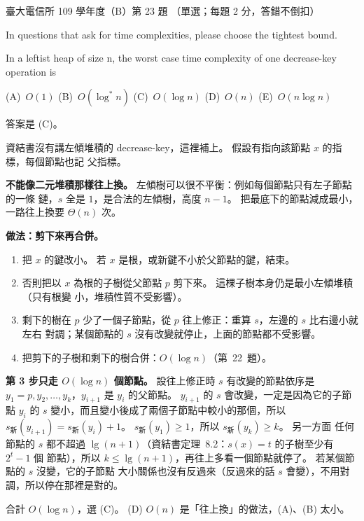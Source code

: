 \begin{pastexam}[label={px:ntu-109-comm-dsa-23}]{臺大電信所 109 學年度（B）第 23 題}
（單選；每題 2 分，答錯不倒扣）

In questions that ask for time complexities, please choose the tightest bound.

In a leftist heap of size n, the worst case time complexity of one decrease-key operation is

(A)~$O(1)$ \qquad (B)~$O(\log^* n)$ \qquad (C)~$O(\log n)$ \qquad (D)~$O(n)$ \qquad (E)~$O(n\log n)$
\end{pastexam}

\begin{pastsoln}
答案是 (C)。

資結書沒有講左傾堆積的 decrease-key，這裡補上。 假設有指向該節點 $x$ 的指標，每個節點也記
父指標。

\textbf{不能像二元堆積那樣往上換。} 左傾樹可以很不平衡：例如每個節點只有左子節點的一條
鏈，$s$ 全是 $1$，是合法的左傾樹，高度 $n - 1$。 把最底下的節點減成最小，一路往上換要
$\Theta(n)$ 次。

\textbf{做法：剪下來再合併。}
\begin{enumerate}
\item 把 $x$ 的鍵改小。 若 $x$ 是根，或新鍵不小於父節點的鍵，結束。
\item 否則把以 $x$ 為根的子樹從父節點 $p$ 剪下來。 這棵子樹本身仍是最小左傾堆積（只有根變
小，堆積性質不受影響）。
\item 剩下的樹在 $p$ 少了一個子節點，從 $p$ 往上修正：重算 $s$，左邊的 $s$ 比右邊小就左右
對調；某個節點的 $s$ 沒有改變就停止，上面的節點都不受影響。
\item 把剪下的子樹和剩下的樹合併：$O(\log n)$（第~22~題）。
\end{enumerate}

\textbf{第 3 步只走 $O(\log n)$ 個節點。} 設往上修正時 $s$ 有改變的節點依序是 $y_1 = p, y_2,
\ldots, y_k$，$y_{i+1}$ 是 $y_i$ 的父節點。 $y_{i+1}$ 的 $s$ 會改變，一定是因為它的子節點 $y_i$
的 $s$ 變小，而且變小後成了兩個子節點中較小的那個，所以 $s_{\text{新}}(y_{i+1}) =
s_{\text{新}}(y_i) + 1$。 $s_{\text{新}}(y_1) \ge 1$，所以 $s_{\text{新}}(y_k) \ge k$。 另一方面
任何節點的 $s$ 都不超過 $\lg(n + 1)$（資結書定理~8.2：$s(x) = t$ 的子樹至少有 $2^t - 1$ 個
節點），所以 $k \le \lg(n + 1)$，再往上多看一個節點就停了。 若某個節點的 $s$ 沒變，它的子節點
大小關係也沒有反過來（反過來的話 $s$ 會變），不用對調，所以停在那裡是對的。

合計 $O(\log n)$，選 (C)。 (D) $O(n)$ 是「往上換」的做法，(A)、(B) 太小。
\end{pastsoln}
